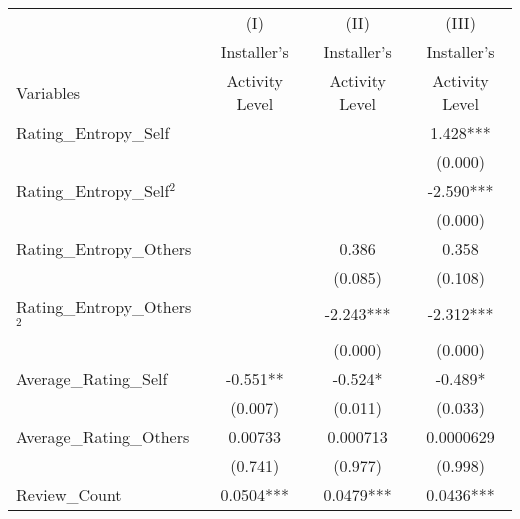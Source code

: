 \begin{table}[]
\centering
\begin{threeparttable}[t]
\begin{tabular}{@{}lccc@{}}
\toprule
                                                     & (I)            & (II)           & (III)          \\ 
                                                     & Installer's    & Installer's    & Installer's    \\
Variables                                            & Activity Level & Activity Level & Activity Level \\ \midrule
Rating\_Entropy\_Self                                &                &                & 1.428***       \\
                                                     &                &                & (0.000)        \\
Rating\_Entropy\_Self$^2$                            &                &                & -2.590***      \\
                                                     &                &                & (0.000)        \\
Rating\_Entropy\_Others                              &                & 0.386          & 0.358          \\
                                                     &                & (0.085)        & (0.108)        \\
Rating\_Entropy\_Others$^2$                          &                & -2.243***      & -2.312***      \\
                                                     &                & (0.000)        & (0.000)        \\
Average\_Rating\_Self                                & -0.551**       & -0.524*        & -0.489*        \\
                                                     & (0.007)        & (0.011)        & (0.033)        \\
Average\_Rating\_Others                              & 0.00733        & 0.000713       & 0.0000629      \\
                                                     & (0.741)        & (0.977)        & (0.998)        \\
Review\_Count                                        & 0.0504***      & 0.0479***      & 0.0436***      \\

\end{tabular}
\end{threeparttable}
\end{table}
